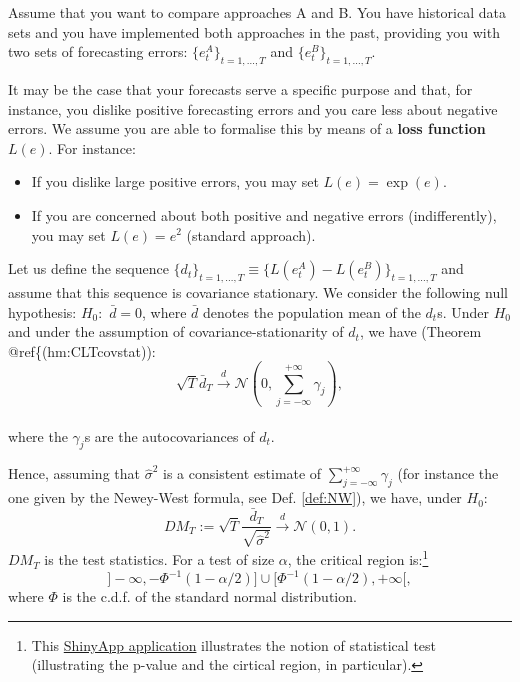 \documentclass[
  12pt,
]{book}
\providecommand{\tightlist}{%
  \setlength{\itemsep}{0pt}\setlength{\parskip}{0pt}}
\theoremstyle{definition}
\theoremstyle{definition}
\theoremstyle{definition}
\theoremstyle{definition}
\theoremstyle{remark}
\begin{document}
Assume that you want to compare approaches A and B. You have historical data sets and you have implemented both approaches in the past, providing you with two sets of forecasting errors: \(\{e^{A}_t\}_{t=1,\dots,T}\) and \(\{e^{B}_t\}_{t=1,\dots,T}\).

It may be the case that your forecasts serve a specific purpose and that, for instance, you dislike positive forecasting errors and you care less about negative errors. We assume you are able to formalise this by means of a \textbf{loss function \(L(e)\)}. For instance:

\begin{itemize}
\tightlist
\item
  If you dislike large positive errors, you may set \(L(e)=\exp(e)\).
\item
  If you are concerned about both positive and negative errors (indifferently), you may set \(L(e)=e^2\) (standard approach).
\end{itemize}

Let us define the sequence \(\{d_t\}_{t=1,\dots,T} \equiv \{L(e^{A}_t)-L(e^{B}_t)\}_{t=1,\dots,T}\) and assume that this sequence is covariance stationary. We consider the following null hypothesis: \(H_0:\) \(\bar{d}=0\), where \(\bar{d}\) denotes the population mean of the \(d_t\)s. Under \(H_0\) and under the assumption of covariance-stationarity of \(d_t\), we have (Theorem @ref\{(hm:CLTcovstat)):
\[
\sqrt{T} \bar{d}_T \overset{d}{\rightarrow} \mathcal{N}\left(0,\sum_{j=-\infty}^{+\infty} \gamma_j \right),
\]\\
where the \(\gamma_j\)s are the autocovariances of \(d_t\).

Hence, assuming that \(\hat{\sigma}^2\) is a consistent estimate of \(\sum_{j=-\infty}^{+\infty} \gamma_j\) (for instance the one given by the Newey-West formula, see Def. \ref{def:NW}), we have, under \(H_0\):
\[
DM_T := \sqrt{T}\frac{\bar{d}_T}{\sqrt{\hat{\sigma}^2}} \overset{d}{\rightarrow}  \mathcal{N}(0,1).
\]
\(DM_T\) is the test statistics. For a test of size \(\alpha\), the critical region is:\footnote{This \href{https://jrenne.shinyapps.io/tests/}{ShinyApp application} illustrates the notion of statistical test (illustrating the p-value and the cirtical region, in particular).}
\[
]-\infty,-\Phi^{-1}(1-\alpha/2)] \cup [\Phi^{-1}(1-\alpha/2),+\infty[,
\]
where \(\Phi\) is the c.d.f. of the standard normal distribution.
\end{document}
